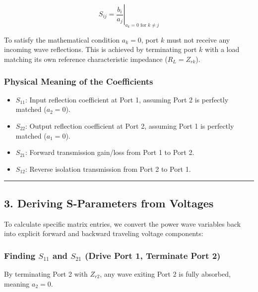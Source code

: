\documentclass[
]{article}
\providecommand{\tightlist}{%
  \setlength{\itemsep}{0pt}\setlength{\parskip}{0pt}}
\begin{document}
\[S_{ij} = \left. \frac{b_i}{a_j} \right|_{a_k = 0 \text{ for } k \neq j}\]

To satisfy the mathematical condition \(a_k = 0\), port \(k\) must not
receive any incoming wave reflections. This is achieved by terminating
port \(k\) with a load matching its own reference characteristic
impedance (\(R_L = Z_{rk}\)).

\subsubsection{Physical Meaning of the
Coefficients}\label{physical-meaning-of-the-coefficients}

\begin{itemize}
\tightlist
\item
  \(S_{11}\): Input reflection coefficient at Port 1, assuming Port 2 is
  perfectly matched (\(a_2 = 0\)).
\item
  \(S_{22}\): Output reflection coefficient at Port 2, assuming Port 1
  is perfectly matched (\(a_1 = 0\)).
\item
  \(S_{21}\): Forward transmission gain/loss from Port 1 to Port 2.
\item
  \(S_{12}\): Reverse isolation transmission from Port 2 to Port 1.
\end{itemize}

\begin{center}\rule{0.5\linewidth}{0.5pt}\end{center}

\subsection{3. Deriving S-Parameters from
Voltages}\label{deriving-s-parameters-from-voltages}

To calculate specific matrix entries, we convert the power wave
variables back into explicit forward and backward traveling voltage
components:

\subsubsection{\texorpdfstring{Finding \(S_{11}\) and \(S_{21}\) (Drive
Port 1, Terminate Port
2)}{Finding S\_\{11\} and S\_\{21\} (Drive Port 1, Terminate Port 2)}}\label{finding-s_11-and-s_21-drive-port-1-terminate-port-2}

By terminating Port 2 with \(Z_{r2}\), any wave exiting Port 2 is fully
absorbed, meaning \(a_2 = 0\).
\end{document}
